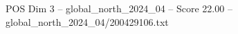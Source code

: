 \begin{textsample}{POS Dim 3 – global\_north\_2024\_04 – Score 22.00 – global\_north\_2024\_04/200429106.txt}
\end{textsample}
